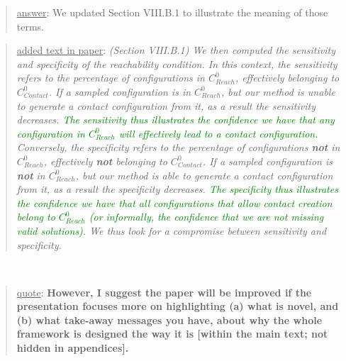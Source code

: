 \documentclass[a4paper]{article}
\newcommand{\gls}[1]{\textit{#1}}
\newcommand{\done}[0]{}
\newcommand\quot[1]{\begin{quote} \underline{quote}: \textbf{#1}\end{quote}}
\newcommand\as[1]{\begin{quote} \underline{answer}: {#1}\end{quote} }
\newcommand\qt[1]{\begin{quote} \underline{added text in paper}: \textit{#1}\end{quote} \leavevmode \\ }
\begin{document}
\as{We updated Section VIII.B.1 to illustrate the meaning of those terms.}
\qt{(Section VIII.B.1) We then computed the sensitivity and specificity of the reachability condition.  In this context, the sensitivity refers to the percentage of configurations in $C_{Reach}^0$, effectively belonging to \gls{$C_{Contact}^0$}. If a sampled configuration is in $C_{Reach}^0$, but our method is unable to generate a contact configuration from it, as a result the sensitivity
decreases. \textcolor{green}{The sensitivity thus illustrates the confidence we have that any configuration in $C_{Reach}^0$ will effectively lead to a contact configuration.}
Conversely, the specificity refers to the percentage of configurations \textbf{not} in $C_{Reach}^0$, effectively \textbf{not} belonging to \gls{$C_{Contact}^0$}.
If a sampled configuration is \textbf{not} in $C_{Reach}^0$, but our method is able to generate a contact configuration from it, as a result the specificity
decreases. \textcolor{green}{The specificity thus illustrates the confidence we have that all configurations that allow contact creation belong to $C_{Reach}^0$ (or informally, the confidence that we are not missing valid solutions).}
We thus look for a compromise between sensitivity and specificity.} \done

\quot{
However, I suggest the paper will be improved if
the presentation focuses more on highlighting (a) what is novel, and
(b)
what take-away messages you have, about why the whole framework is
designed the way it is [within the main text; not hidden in
appendices].}
\end{document}
